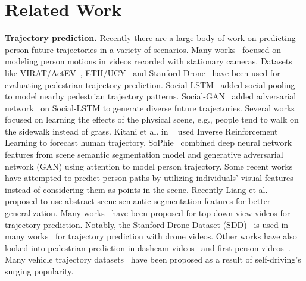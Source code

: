 \documentclass[runningheads]{eccv2020/llncs}
\begin{document}
\section{Related Work}
\noindent\textbf{Trajectory prediction.}
Recently there are a large body of work on predicting person future trajectories in a variety of scenarios.
Many works~\cite{alahi2016social,manh2018scene,xue2018ss,zhang2019sr,liang2019peeking,liang2020garden,sadeghian2018sophie} focused on modeling person motions in videos recorded with stationary cameras.
Datasets like VIRAT/ActEV~\cite{oh2011large}, ETH/UCY~\cite{lerner2007crowds,luber2010people} and Stanford Drone~\cite{robicquet2016learning} have been used for evaluating pedestrian trajectory prediction.
Social-LSTM~\cite{alahi2016social} added social pooling to model nearby pedestrian trajectory patterns. 
Social-GAN~\cite{gupta2018social} added adversarial network~\cite{goodfellow2014generative} on Social-LSTM to generate diverse future trajectories. 
Several works focused on learning the effects of the physical scene, e.g., people tend to walk on the sidewalk instead of grass. 
Kitani et al. in ~\cite{kitani2012activity} used Inverse Reinforcement Learning to forecast human trajectory. 
SoPhie~\cite{sadeghian2018sophie} combined deep neural network features from scene semantic segmentation model and generative adversarial network (GAN) using attention to model person trajectory.
Some recent works~\cite{kooij2014context,yagi2018future,ma2017forecasting,liang2019peeking} have attempted to predict person paths by utilizing individuals' visual features instead of considering them as points in the scene.
Recently Liang et al.~\cite{liang2020garden} proposed to use abstract scene semantic segmentation features for better generalization.
Many works~\cite{lee2017desire,sadeghian2018car,bansal2018chauffeurnet,hong2019rules,zhao2019multi,makansi2019overcoming,li2019way,rhinehart2018r2p2} have been proposed for top-down view videos for trajectory prediction.
Notably, the Stanford Drone Dataset (SDD)~\cite{robicquet2016learning} is used in many works~\cite{sadeghian2018sophie,deo2020trajectory,li2019way} for trajectory prediction with drone videos.
Other works have also looked into pedestrian prediction in dashcam videos~\cite{mangalam2019disentangling,styles2019forecasting,kooij2014context,lee2017desire} and first-person videos~\cite{yagi2018future,styles2019multiple}.
Many vehicle trajectory datasets~\cite{caesar2019nuscenes,chang2019argoverse,yu2018bdd100k} have been proposed as a result of self-driving's surging popularity. 
\end{document}
